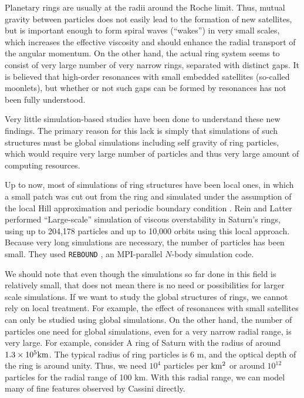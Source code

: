 \documentclass[sigconf]{acmart}
\begin{document}
Planetary rings are usually at the radii around the Roche limit. Thus,
mutual gravity between particles does not easily  lead to the
formation of new satellites, but is important enough to form spiral
waves (``wakes'') in very small scales, which increases the effective
viscosity and should enhance the radial transport of the angular
momentum. On the other hand, the actual ring system seems to consist of very
large number of very narrow rings, separated with distinct gaps. It is
believed that high-order resonances with small embedded satellites
(so-called moonlets), but whether or not such gaps can be formed by
resonances has not been fully understood. 

Very little simulation-based studies have been done to understand
these new findings. The primary reason for this lack is simply that
simulations of such structures must be global simulations including
self gravity of ring particles, which would require very large number
of particles and thus very large amount of  computing resources.

Up to now, most of simulations of ring structures have been local
ones, in which a small patch  was cut out from the ring and simulated
under the assumption of the local Hill approximation and periodic
boundary condition \cite{WisdomTremaine1988}. Rein and Latter
\cite{ReinLatter2013} performed ``Large-scale'' simulation of viscous
overstability in Saturn's rings, using up to 204,178 particles and up
to 10,000 orbits using this local approach.  Because very long
simulations are necessary, the number of particles has been
small. They used {\tt REBOUND} \cite{ReinLiu2012}, an MPI-parallel
$N$-body simulation code.



We should note that even though the simulations so far done in this
field is relatively small, that does not mean there is no need or
possibilities for larger scale simulations. If we want to study the
global structures of rings, we cannot rely on local treatment. For
example, the effect of resonances with small satellites can only be
studied using global simulations. On the other hand, the number of
particles one need for global simulations, even  for a very narrow
radial range, is very large. For example, consider A ring of Saturn
with the radius of around $1.3\times 10^5\rm km$. The typical radius
of ring particles is 6 m\cite{ZEBKER1985531}, and the optical depth of
the ring is around unity. Thus, we need $10^4$ particles per $\rm
km^2$ or around $10^{12}$ particles for the radial range of 100
km. With this radial range, we can model many of fine features observed
by Cassini directly.
\end{document}
